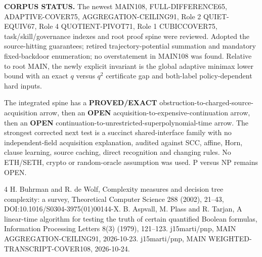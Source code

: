 \documentclass[11pt]{article}
\begin{document}
\noindent\textbf{CORPUS STATUS.} The newest MAIN108, FULL-DIFFERENCE65, ADAPTIVE-COVER75, AGGREGATION-CEILING91, Role 2 QUIET-EQUIV67, Role 4 QUOTIENT-PIVOT71, Role 1 CUBICCOVER75, task/skill/governance indexes and root proof spine were reviewed. Adopted the source-hitting guarantees; retired trajectory-potential summation and mandatory fixed-backdoor enumeration; no overstatement in MAIN108 was found. Relative to root MAIN, the newly explicit invariant is the global adaptive minimax lower bound with an exact $q$ versus $q^2$ certificate gap and both-label policy-dependent hard inputs.

The integrated spine has a \textbf{PROVED/EXACT} obstruction-to-charged-source-acquisition arrow, then an \textbf{OPEN} acquisition-to-expensive-continuation arrow, then an \textbf{OPEN} continuation-to-unrestricted-superpolynomial-time arrow. The strongest corrected next test is a succinct shared-interface family with no independent-field acquisition explanation, audited against SCC, affine, Horn, clause learning, source caching, direct recognition and changing rules. No ETH/SETH, crypto or random-oracle assumption was used. P versus NP remains OPEN.

\begin{thebibliography}{4}
 H. Buhrman and R. de Wolf, Complexity measures and decision tree complexity: a survey, Theoretical Computer Science 288 (2002), 21--43, DOI:10.1016/S0304-3975(01)00144-X.
 B. Aspvall, M. Plass and R. Tarjan, A linear-time algorithm for testing the truth of certain quantified Boolean formulas, Information Processing Letters 8(3) (1979), 121--123.
 j15marti/pnp, MAIN AGGREGATION-CEILING91, 2026-10-23.
 j15marti/pnp, MAIN WEIGHTED-TRANSCRIPT-COVER108, 2026-10-24.
\end{thebibliography}
\end{document}
